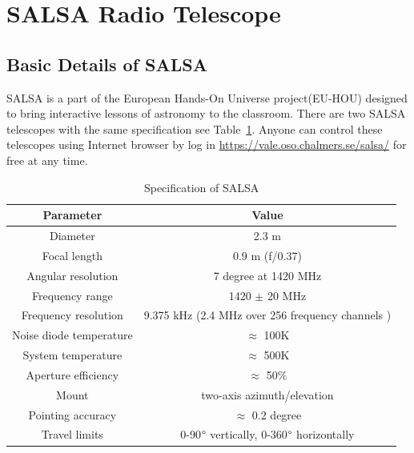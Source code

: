 \documentclass[10pt,conference]{IEEEtran}
\begin{document}
\section{SALSA Radio Telescope}

\subsection{Basic Details of SALSA}

SALSA is a part of the European Hands-On Universe project(EU-HOU)\cite{Ferlet2006} designed to bring interactive lessons of astronomy to the classroom\cite{SALSAS2018}. There are two SALSA telescopes with the same specification see Table~\ref{Tab:salsa_specification}\cite{ThomasBensby2017}. Anyone can control these telescopes using Internet browser by log in \url{https://vale.oso.chalmers.se/salsa/} for free at any time. 


\begin{table}[htbp]
\caption{Specification of SALSA}
\begin{center}
\begin{tabular}{|c|c|}
\hline
\textbf{Parameter}&\multicolumn{1}{|c|}{\textbf{Value}} \\
\cline{1-2} 
\hline
Diameter & 2.3 m\\
\hline
Focal length & 0.9 m (f/0.37)\\
\hline
Angular resolution & 7 degree at 1420 MHz\\
\hline
Frequency range & 1420 $\pm$ 20 MHz\\
\hline
Frequency resolution & 9.375 kHz (2.4 MHz over 256 frequency channels )\\
\hline
Noise diode temperature & $\approx$ 100K\\
\hline
System temperature & $\approx$ 500K\\
\hline
Aperture efficiency & $\approx$ 50$\%$\\
\hline
Mount & two-axis azimuth/elevation\\
\hline
Pointing accuracy & $\approx$ 0.2 degree\\
\hline
Travel limits &  0-90$\degree$ vertically, 0-360$\degree$ horizontally\\
\hline
\end{tabular}
\label{Tab:salsa_specification}
\end{center}
\end{table}
\end{document}
